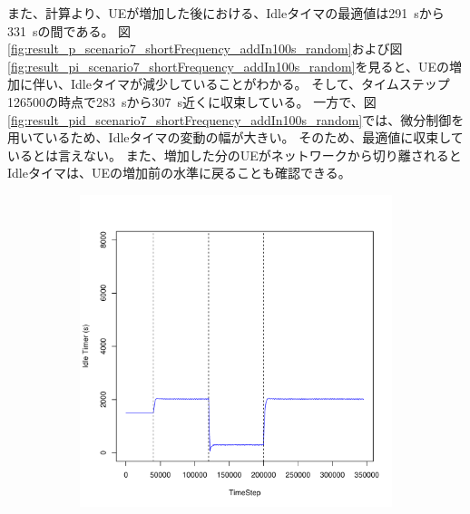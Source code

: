 \documentclass[a4j]{ujarticle}
\begin{document}
また、計算より、UEが増加した後における、Idleタイマの最適値は291~sから331~sの間である。
図\ref{fig:result_p_scenario7_shortFrequency_addIn100s_random}および図\ref{fig:result_pi_scenario7_shortFrequency_addIn100s_random}を見ると、UEの増加に伴い、Idleタイマが減少していることがわかる。
そして、タイムステップ126500の時点で283~sから307~s近くに収束している。
一方で、図\ref{fig:result_pid_scenario7_shortFrequency_addIn100s_random}では、微分制御を用いているため、Idleタイマの変動の幅が大きい。
そのため、最適値に収束しているとは言えない。
また、増加した分のUEがネットワークから切り離されるとIdleタイマは、UEの増加前の水準に戻ることも確認できる。
\begin{figure}[htbp]
 \centering
 \begin{subfigure}{0.49\hsize}
   \centering
   \includegraphics[width=1.0\hsize]{scenario_7_idleTimer_0_691200_1-5_0_0_0_shortFrequency_addIn100s_random.pdf}
   \label{subfig:scenario_7_idleTimer_0_691200_1-5_0_0_0_shortFrequency_addIn100s_random}

\end{subfigure}
\end{figure}
\end{document}
